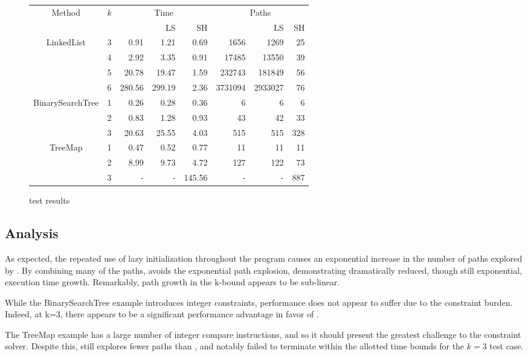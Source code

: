 \begin{figure*}[t]
  \centering
  \begin{tabular}{| c | c | r | r | r | r | r | r |}
  \hline
   \multirow{2}{*}{Method }&\multirow{2}{*}{ $k$ }
   &\multicolumn{3}{|c|}{Time} &\multicolumn{3}{|c|}{ Paths }\\
								&	&\gsetxt{} & LS	&SH		&\gsetxt{}	& LS & SH\\
   \hline
    \multirow{3}{*}{LinkedList }			&3	& 0.91	& 1.21	& 0.69	&1656	& 1269	& 25\\
   		 						& 4	& 2.92	& 3.35	& 0.91	&17485	& 13550	& 39\\
   								& 5	& 20.78	& 19.47	& 1.59	&232743	& 181849	& 56\\
								& 6	& 280.56	& 299.19	& 2.36	&3731094	&2933027	& 76\\
    \hline
    \multirow{3}{*}{BinarySearchTree }	& 1	& 0.26	& 0.28	& 0.36	& 6		& 6		& 6\\
   		 						& 2	& 0.83	& 1.28	& 0.93	& 43		& 42		& 33\\
   								& 3	& 20.63	& 25.55	& 4.03	& 515	& 515	& 328\\
    \hline
      \multirow{3}{*}{TreeMap}			& 1	& 0.47	& 0.52	& 0.77	& 11		& 11		& 11\\
   		 						& 2	& 8.99	& 9.73	& 4.72	& 127	& 122	& 73\\
   								& 3	& -		& -		& 145.56	& -		& -		& 887\\
						
    \hline
  \end{tabular}
  \caption{test results}
  \label{tab:results}
\end{figure*}

\subsection{Analysis}

As expected, the repeated use of lazy initialization throughout the program causes an exponential increase in the number of paths explored by \gsetxt{}. By combining many of the \gsetxt{} paths, \symtxt{} avoids the exponential path explosion, demonstrating dramatically reduced, though still exponential, execution time growth. Remarkably, path growth in the k-bound appears to be sub-linear.

While the BinarySearchTree example introduces integer constraints, \symtxt{} performance does not appear to suffer due to the constraint burden. Indeed, at k=3, there appears to be a significant performance advantage in favor of \symtxt{}.

The TreeMap example has a large number of integer compare instructions, and so it should present the greatest challenge to the constraint solver. Despite this, \symtxt{} still explores fewer paths than \gsetxt{}, and \gsetxt{} notably failed to terminate within the allotted time bounds for the $k=3$ test case.



